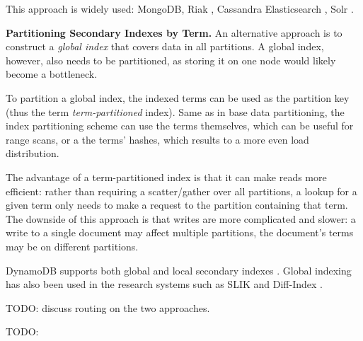 This approach is widely used: MongoDB, Riak \cite{riakv:secondaryindexes}, Cassandra \cite{cassandra:secondaryindexing}
Elasticsearch \cite{elastic:docrouting}, Solr \cite{solr:indexsharding}.

\bigskip

\noindent
\textbf{Partitioning Secondary Indexes by Term.}
An alternative approach is to construct a \textit{global index} that covers data in all partitions.
A global index, however, also needs to be partitioned, as storing it on one node would likely become a bottleneck.

To partition a global index, the indexed terms can be used as the partition key (thus the term \textit{term-partitioned}
index).
Same as in base data partitioning, the index partitioning scheme can use the terms themselves, which can be useful for
range scans, or a the terms' hashes, which results to a more even load distribution.

The advantage of a term-partitioned index is that it can make reads more efficient:
rather than requiring a scatter/gather over all partitions, a lookup for a given term only needs to make a request to the
partition containing that term.
The downside of this approach is that writes are more complicated and slower:
a write to a single document may affect multiple partitions, the document's terms may be on different partitions.

DynamoDB supports both global and local secondary indexes \cite{dynamodb:secondaryindexes}.
Global indexing has also been used in the research systems such as SLIK \cite{kejriwal:slik} and Diff-Index \cite{tan:diffindex}.

\bigskip
TODO: discuss routing on the two approaches.

TODO:


